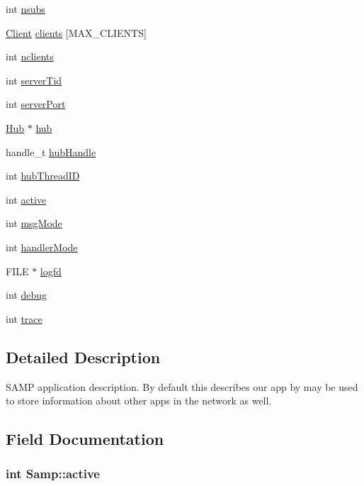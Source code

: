 \begin{CompactItemize}
\item 
int \hyperlink{structSamp_36f4cfae3407b8961e57a77abca7d599}{nsubs}
\item 
\hyperlink{structClient}{Client} \hyperlink{structSamp_88b93a7a3dbafd6dabba7c76c40ec9d0}{clients} \mbox{[}MAX\_\-CLIENTS\mbox{]}
\item 
int \hyperlink{structSamp_97ef8ad57159f4b6c4fcd93a12853b69}{nclients}
\item 
int \hyperlink{structSamp_69b05b2fa1ab19729d81659ad64387a0}{serverTid}
\item 
int \hyperlink{structSamp_8849cb13cbedae805b4e35327bc449e2}{serverPort}
\item 
\hyperlink{structHub}{Hub} $\ast$ \hyperlink{structSamp_7368fd66d8153c325dfffbb5652f3179}{hub}
\item 
handle\_\-t \hyperlink{structSamp_03918136809ece7e60de4e30c64b6224}{hubHandle}
\item 
int \hyperlink{structSamp_723b2538cfd65122c49783b36a7d30b5}{hubThreadID}
\item 
int \hyperlink{structSamp_32402da48b11693c13252edbdca7673c}{active}
\item 
int \hyperlink{structSamp_30ca22535582e7bf6416627d1cd46525}{msgMode}
\item 
int \hyperlink{structSamp_14f6ed59a947504d37bd8cdd1f2f8e8d}{handlerMode}
\item 
FILE $\ast$ \hyperlink{structSamp_7a7b2ade9816147464d784518bcad01d}{logfd}
\item 
int \hyperlink{structSamp_d8469d2447cd872101fb83d92f85049e}{debug}
\item 
int \hyperlink{structSamp_25ddaf846639c7c67ea651a578b804ad}{trace}
\end{CompactItemize}


\subsection{Detailed Description}
SAMP application description. By default this describes our app by may be used to store information about other apps in the network as well. 

\subsection{Field Documentation}
\hypertarget{structSamp_32402da48b11693c13252edbdca7673c}{
\subsubsection[{active}]{\setlength{\rightskip}{0pt plus 5cm}int {\bf Samp::active}}}
\label{structSamp_32402da48b11693c13252edbdca7673c}


